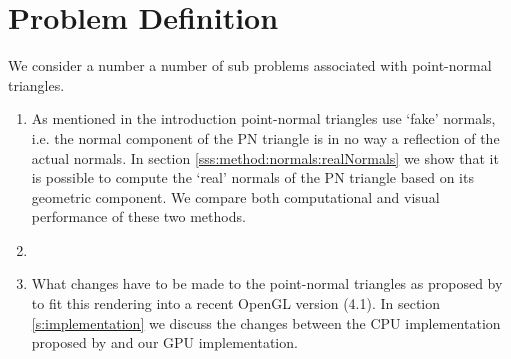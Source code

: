 \section{Problem Definition}
\label{s:problem}
We consider a number a number of sub problems associated with point-normal triangles.

\begin{enumerate}[label=(\roman*)]
	\item \label{it:problem:fakeNormals}
	As mentioned in the introduction point-normal triangles use `fake' normals, i.e. the normal component of the PN triangle is in no way a reflection of the actual normals. In section \ref{sss:method:normals:realNormals} we show that it is possible to compute the `real' normals of the PN triangle based on its geometric component. We compare both computational and visual performance of these two methods. 

	\item \label{it:problem:CompareWithPhongTesselation}

	\item \label{it:problem:GPUImplementation}
	What changes have to be made to the point-normal triangles as proposed by \citeauthor{vlachos2001curved} to fit this rendering into a recent OpenGL version (4.1).  
	In section \ref{s:implementation} we discuss the changes between the CPU implementation proposed by \citeauthor{vlachos2001curved} and our GPU implementation. 
\end{enumerate}